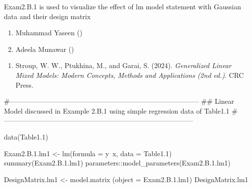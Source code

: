 \documentclass[a4paper]{book}
\begin{document}
%
\begin{Description}
Exam2.B.1 is used to visualize the effect of lm model statement with Gaussian data and their design matrix
\end{Description}
%
\begin{Author}
\begin{enumerate}

\item{}  Muhammad Yaseen ()
\item{} Adeela Munawar ()

\end{enumerate}

\end{Author}
%
\begin{References}
\begin{enumerate}

\item{} Stroup, W. W., Ptukhina, M., and Garai, S. (2024).
\emph{Generalized Linear Mixed Models: Modern Concepts, Methods and Applications (2nd ed.)}.
CRC Press.

\end{enumerate}

\end{References}
%
\begin{SeeAlso}
\end{SeeAlso}
%
\begin{Examples}
\begin{ExampleCode}
#-----------------------------------------------------------------------------------
## Linear Model  discussed in Example 2.B.1 using simple regression data of Table1.1
#-----------------------------------------------------------------------------------

data(Table1.1)

Exam2.B.1.lm1 <- lm(formula = y~x, data = Table1.1)
summary(Exam2.B.1.lm1)
parameters::model_parameters(Exam2.B.1.lm1)

DesignMatrix.lm1 <- model.matrix (object = Exam2.B.1.lm1)
DesignMatrix.lm1

\end{ExampleCode}
\end{Examples}
\end{document}
